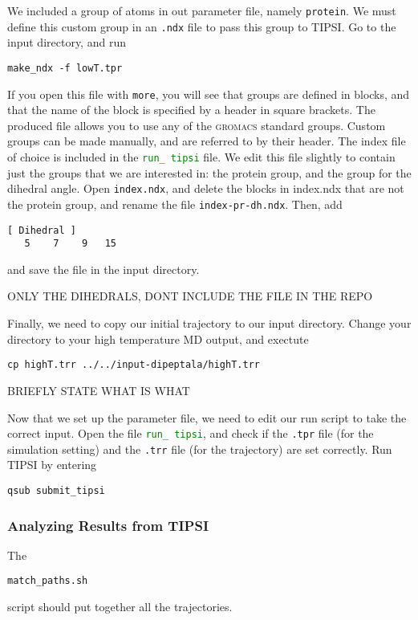 \documentclass[]{article}
\begin{document}
We included a group of atoms in out parameter file, namely \texttt{protein}. We must define this custom group in an \texttt{.ndx} file to pass this group to TIPSI. Go to the input directory, and run
%
\begin{lstlisting}
make_ndx -f lowT.tpr
\end{lstlisting}
%
If you open this file with \texttt{more}, you will see that groups are defined in blocks, and that the name of the block is specified by a header in square brackets. The produced file allows you to use any of the \textsc{gromacs} standard groups. Custom groups can be made manually, and are referred to by their header. The index file of choice is included in the \textcolor{green}{\texttt{run\_ tipsi}} file. We edit this file slightly to contain just the groups that we are interested in: the protein group, and the group for the dihedral angle. Open \texttt{index.ndx}, and delete the blocks in index.ndx that are not the protein group, and rename the file \texttt{index-pr-dh.ndx}. Then, add
%
\begin{lstlisting}
[ Dihedral ]
   5    7    9   15
\end{lstlisting}
%
and save the file in the input directory.

ONLY THE DIHEDRALS, DONT INCLUDE THE FILE IN THE REPO

Finally, we need to copy our initial trajectory to our input directory. Change your directory to your high temperature MD output, and exectute 
%
\begin{lstlisting}
cp highT.trr ../../input-dipeptala/highT.trr
\end{lstlisting}
%

BRIEFLY STATE  WHAT IS WHAT

Now that we set up the parameter file, we need to edit our run script to take the correct input. Open the file \textcolor{green}{\texttt{run\_ tipsi}}, and check if the \texttt{.tpr} file (for the simulation setting) and the \texttt{.trr} file (for the trajectory) are set correctly. Run \textsc{TIPSI} by entering
%
\begin{lstlisting}
qsub submit_tipsi
\end{lstlisting}
%

\subsubsection*{Analyzing Results from TIPSI}

The \begin{lstlisting}match_paths.sh\end{lstlisting} script should put together all the trajectories.
\end{document}
